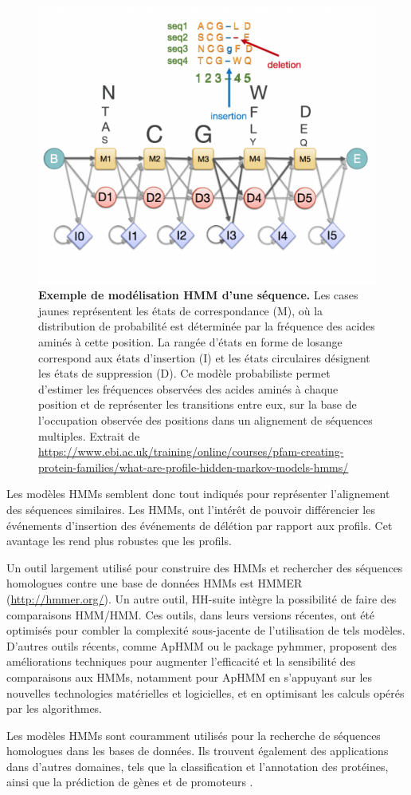 \begin{figure}[htbp]
    \centering
    \includegraphics[width=0.5\linewidth]{images/HMM_ex.png}
    \caption[Exemple de modélisation HMM d'une séquence]{\textbf{Exemple de modélisation HMM d'une séquence.} Les cases jaunes représentent les états de correspondance (M), où la distribution de probabilité est déterminée par la fréquence des acides aminés à cette position. La rangée d'états en forme de losange correspond aux états d'insertion (I) et les états circulaires désignent les états de suppression (D). Ce modèle probabiliste permet d’estimer les fréquences observées des acides aminés à chaque position et de représenter les transitions entre eux, sur la base de l’occupation observée des positions dans un alignement de séquences multiples. Extrait de \url{https://www.ebi.ac.uk/training/online/courses/pfam-creating-protein-families/what-are-profile-hidden-markov-models-hmms/}}
    \label{fig:HMM_ex}
\end{figure}

Les modèles HMMs semblent donc tout indiqués pour représenter l'alignement des séquences similaires. Les HMMs, ont l'intérêt de pouvoir différencier les événements d'insertion des événements de délétion par rapport aux profils. Cet avantage les rend plus robustes que les profils. 

Un outil largement utilisé pour construire des HMMs et rechercher des séquences homologues contre une base de données HMMs est HMMER (\url{http://hmmer.org/}). Un autre outil, HH-suite \cite{steinegger_hh-suite3_2019}  intègre la possibilité de faire des comparaisons HMM/HMM. Ces outils, dans leurs versions récentes, ont été optimisés pour combler la complexité sous-jacente de l'utilisation de tels modèles. D'autres outils récents, comme ApHMM \cite{firtina_aphmm_2024} ou le package pyhmmer\cite{larralde_pyhmmer_2023}, proposent des améliorations techniques pour augmenter l'efficacité et la sensibilité des comparaisons aux HMMs, notamment pour ApHMM en s'appuyant sur les nouvelles technologies matérielles et logicielles, et en optimisant les calculs opérés par les algorithmes.

Les modèles HMMs sont couramment utilisés pour la recherche de séquences homologues dans les bases de données. Ils trouvent également des applications dans d'autres domaines, tels que la classification et l'annotation des protéines, ainsi que la prédiction de gènes et de promoteurs \cite{dimri_hidden_2024}.
